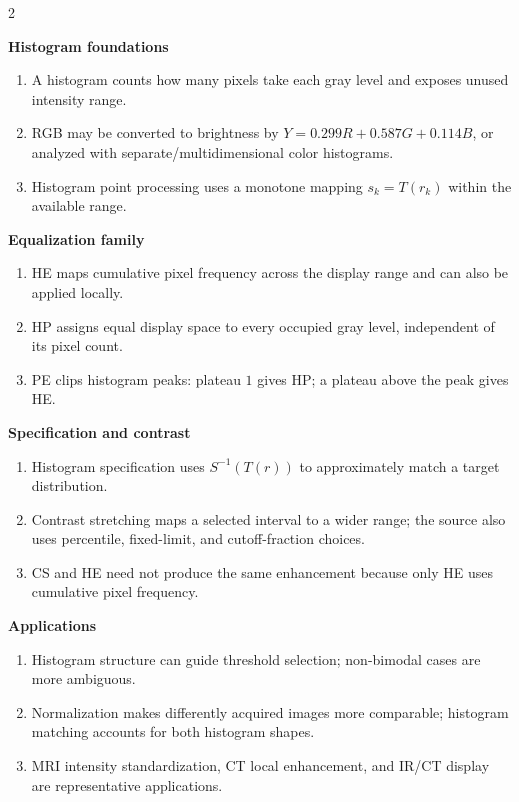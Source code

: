 \documentclass[11pt,a4paper,oneside]{report}
\newcommand{\reviewgroup}[1]{%
  \par\vspace{0.7em}%
  {\sffamily\bfseries\color{SapienzaRed}#1}\par\vspace{0.10em}%
}
\begin{document}
\begin{multicols}{2}
\normalsize
\reviewgroup{Histogram foundations}
\begin{enumerate}[label=\textcolor{SapienzaRed}{\bfseries\arabic*.},leftmargin=1.8em,itemsep=0.36em]
\item A histogram counts how many pixels take each gray level and exposes unused intensity range.
\item RGB may be converted to brightness by $Y=0.299R+0.587G+0.114B$, or analyzed with separate/multidimensional color histograms.
\item Histogram point processing uses a monotone mapping $s_k=T(r_k)$ within the available range.
\end{enumerate}
\reviewgroup{Equalization family}
\begin{enumerate}[resume,label=\textcolor{SapienzaRed}{\bfseries\arabic*.},leftmargin=1.8em,itemsep=0.36em]
\item HE maps cumulative pixel frequency across the display range and can also be applied locally.
\item HP assigns equal display space to every occupied gray level, independent of its pixel count.
\item PE clips histogram peaks: plateau $1$ gives HP; a plateau above the peak gives HE.
\end{enumerate}
\reviewgroup{Specification and contrast}
\begin{enumerate}[resume,label=\textcolor{SapienzaRed}{\bfseries\arabic*.},leftmargin=1.8em,itemsep=0.36em]
\item Histogram specification uses $S^{-1}(T(r))$ to approximately match a target distribution.
\item Contrast stretching maps a selected interval to a wider range; the source also uses percentile, fixed-limit, and cutoff-fraction choices.
\item CS and HE need not produce the same enhancement because only HE uses cumulative pixel frequency.
\end{enumerate}
\reviewgroup{Applications}
\begin{enumerate}[resume,label=\textcolor{SapienzaRed}{\bfseries\arabic*.},leftmargin=1.8em,itemsep=0.36em]
\item Histogram structure can guide threshold selection; non-bimodal cases are more ambiguous.
\item Normalization makes differently acquired images more comparable; histogram matching accounts for both histogram shapes.
\item MRI intensity standardization, CT local enhancement, and IR/CT display are representative applications.
\end{enumerate}
\end{multicols}
\end{document}
